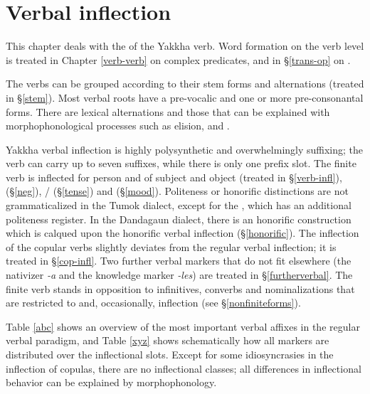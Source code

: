 ﻿\chapter{Verbal inflection}\label{verbalmorph}

This chapter deals with the  of the Yakkha verb. Word formation on the verb level is treated in  Chapter \ref{verb-verb} on complex predicates, and in §\ref{trans-op} on .

The verbs can be grouped according to their stem forms and alternations (treated in §\ref{stem}). Most verbal roots have a pre-vocalic and one or more pre-consonantal  forms. There are lexical alternations and those that can be explained with morphophonological processes such as elision,  and . 

Yakkha verbal inflection is highly polysynthetic and overwhelmingly suffixing; the verb can carry up to seven suffixes, while there is only one prefix slot. The finite verb is  inflected for person and  of subject and object (treated in §\ref{verb-infl}),  (§\ref{neg}),  / (§\ref{tense}) and   (§\ref{mood}). Politeness or honorific distinctions are not grammaticalized in the Tumok dialect, except for the , which has an additional politeness register. In the Dandagaun dialect,  there is an honorific construction which is calqued upon the  honorific verbal inflection  (§\ref{honorific}). The inflection of the copular verbs slightly deviates from the regular verbal inflection; it is treated in §\ref{cop-infl}. Two further verbal markers that do not fit elsewhere (the nativizer \emph{-a} and the knowledge marker \emph{-les})  are treated in §\ref{furtherverbal}. The finite verb stands in opposition to infinitives, converbs and nominalizations that are restricted to  and, occasionally,  inflection (see §\ref{nonfiniteforms}). 



Table \ref{abc} shows an overview of the most important verbal affixes in the regular verbal paradigm, and Table \ref{xyz} shows schematically how all  markers are distributed over the inflectional slots. Except for some idiosyncrasies in the inflection of copulas, there are no inflectional classes; all differences in inflectional behavior can be explained by morphophonology. 


